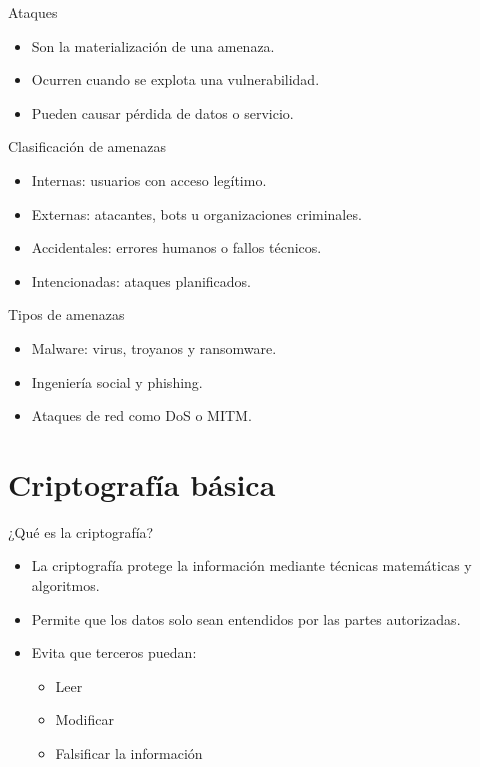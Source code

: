 \documentclass{beamer}
\begin{document}
\begin{frame}{Ataques}
\begin{itemize}
    \item Son la materialización de una amenaza.
    \item Ocurren cuando se explota una vulnerabilidad.
    \item Pueden causar pérdida de datos o servicio.
\end{itemize}
\end{frame}

\begin{frame}{Clasificación de amenazas}
\begin{itemize}
    \item Internas: usuarios con acceso legítimo.
    \item Externas: atacantes, bots u organizaciones criminales.
    \item Accidentales: errores humanos o fallos técnicos.
    \item Intencionadas: ataques planificados.
\end{itemize}
\end{frame}

\begin{frame}{Tipos de amenazas}
\begin{itemize}
    \item Malware: virus, troyanos y ransomware.
    \item Ingeniería social y phishing.
    \item Ataques de red como DoS o MITM.
\end{itemize}
\end{frame}


\section{Criptografía básica}

\begin{frame}{¿Qué es la criptografía?}
\begin{itemize}
  \item La criptografía protege la información mediante técnicas matemáticas y algoritmos.
  \item Permite que los datos solo sean entendidos por las partes autorizadas.
  \item Evita que terceros puedan:
  \begin{itemize}
    \item Leer
    \item Modificar
    \item Falsificar la información
  \end{itemize}
\end{itemize}
\end{frame}
\end{document}
